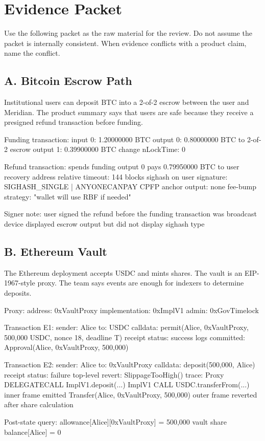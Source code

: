 \section*{Evidence Packet}

Use the following packet as the raw material for the review. Do not assume the packet is internally consistent. When evidence conflicts with a product claim, name the conflict.

\subsection*{A. Bitcoin Escrow Path}

Institutional users can deposit BTC into a 2-of-2 escrow between the user and Meridian. The product summary says that users are safe because they receive a presigned refund transaction before funding.

\begin{codeblock}
Funding transaction:
    input 0: 1.20000000 BTC
    output 0: 0.80000000 BTC to 2-of-2 escrow
    output 1: 0.39900000 BTC change
    nLockTime: 0

Refund transaction:
    spends funding output 0
    pays 0.79950000 BTC to user recovery address
    relative timeout: 144 blocks
    sighash on user signature: SIGHASH_SINGLE | ANYONECANPAY
    CPFP anchor output: none
    fee-bump strategy: "wallet will use RBF if needed"

Signer note:
    user signed the refund before the funding transaction was broadcast
    device displayed escrow output but did not display sighash type
\end{codeblock}

\subsection*{B. Ethereum Vault}

The Ethereum deployment accepts USDC and mints shares. The vault is an EIP-1967-style proxy. The team says events are enough for indexers to determine deposits.

\begin{codeblock}
Proxy:
    address: 0xVaultProxy
    implementation: 0xImplV1
    admin: 0xGovTimelock

Transaction E1:
    sender: Alice
    to: USDC
    calldata: permit(Alice, 0xVaultProxy, 500,000 USDC, nonce 18, deadline T)
    receipt status: success
    logs committed:
        Approval(Alice, 0xVaultProxy, 500,000)

Transaction E2:
    sender: Alice
    to: 0xVaultProxy
    calldata: deposit(500,000, Alice)
    receipt status: failure
    top-level revert: SlippageTooHigh()
    trace:
        Proxy DELEGATECALL ImplV1.deposit(...)
        ImplV1 CALL USDC.transferFrom(...)
        inner frame emitted Transfer(Alice, 0xVaultProxy, 500,000)
        outer frame reverted after share calculation

Post-state query:
    allowance[Alice][0xVaultProxy] = 500,000
    vault share balance[Alice] = 0
\end{codeblock}


